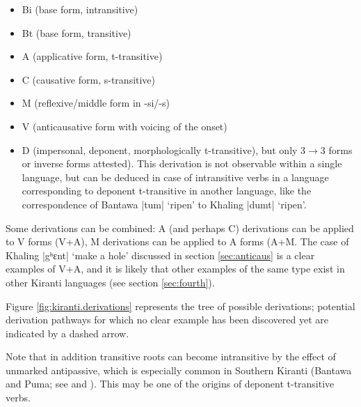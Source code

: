 \documentclass[oneside,a4paper,11pt]{article}
\newcommand{\ipa}[1]{{\phon\mbox{#1}}} %
\newcommand{\dhatu}[2]{|\ipa{#1}| `#2'}
\begin{document}
\begin{itemize}
\item  Bi (base form, intransitive)
\item  Bt (base form, transitive)
\item  A (applicative form, t-transitive)
\item  C (causative form, s-transitive)
\item M (reflexive/middle form in -si/-s)
\item V (anticausative form with voicing of the onset)
\item D (impersonal, deponent, morphologically t-transitive), but only 3$\rightarrow$3 forms or inverse forms attested). This derivation is not observable within a single language, but can be deduced in case of intransitive verbs in a language corresponding to deponent t-transitive in another language, like  the correspondence of Bantawa \dhatu{tum}{ripen} to Khaling \dhatu{dumt}{ripen}.
\end{itemize}

Some derivations can be combined: A (and perhaps C) derivations can be applied to V forms (V+A), M derivations can be applied to A forms (A+M. The case of Khaling \dhatu{gʰɛnt}{make a hole} discussed in section \ref{sec:anticaus} is a clear examples of V+A, and it is likely that other examples of the same type exist in other Kiranti languages (see section \ref{sec:fourth}). 

Figure \ref{fig:kiranti.derivations} represents the tree of possible derivations; potential derivation pathways for which no clear example has been discovered yet are indicated by a dashed arrow. 

Note that in addition transitive roots can become intransitive by the effect of unmarked antipassive, which is especially common in Southern Kiranti (Bantawa and Puma; see \citealt{bickel07puma} and \citealt{bickel15antipassive}). This may be one of the origins of deponent t-transitive verbs.
\end{document}
